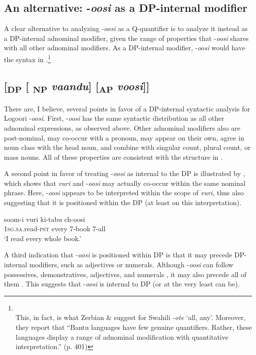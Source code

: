 \documentclass[output=paper]{langsci/langscibook}
\begin{document}
\subsection{An alternative: -\textit{oosi} as a DP-internal modifier}

A clear alternative to analyzing -\textit{oosi} as a Q-quantifier is to analyze it instead as a DP-internal adnominal modifier, given the range of properties that -\textit{oosi} shares with all other adnominal modifiers. As a DP-internal modifier, -\textit{oosi} would have the syntax in .\footnote{\\
 This, in fact, is what Zerbian \& \citet{Krifka2008} suggest for Swahili -\textit{ote} ‘all, any’. Moreover, they report that “Bantu languages have few genuine quantifiers. Rather, these languages display a range of adnominal modification with quantitative interpretation.” (p. 401)} 

\subsection{      [\textsubscript{DP} [\textsubscript{ NP} \textit{vaandu}] [\textsubscript{AP} \textit{voosi}]]}

  There are, I believe, several points in favor of a DP-internal syntactic analysis for Logoori -\textit{oosi}. First, -\textit{oosi} has the same syntactic distribution as all other adnominal expressions, as observed above. Other adnominal modifiers also are post-nominal, may co-occur with a pronoun, may appear on their own, agree in noun class with the head noun, and combine with singular count, plural count, or mass nouns. All of these properties are consistent with the structure in . 

  A second point in favor of treating -\textit{oosi} as internal to the DP is illustrated by , which shows that \textit{vuri} and -\textit{oosi} may actually co-occur within the same nominal phrase. Here, -\textit{oosi} appears to be interpreted within the scope of \textit{vuri}, thus also suggesting that it is positioned within the DP (at least on this interpretation).

\ea
\gll soom-i      vuri    ki-tabu  ch-oosi\\
     1\textsc{sg.sa}.read-\textsc{pst}  every    7-book  7-all \\
\glt ‘I read every whole book.’
\z

  A third indication that -\textit{oosi} is positioned within DP is that it may precede DP-internal modifiers, such as adjectives or numerals. Although -\textit{oosi} can follow possessives, demonstratives, adjectives, and numerals , it may also precede all of them . This suggests that -\textit{oosi} is internal to DP (or at the very least can be). 
\end{document}
